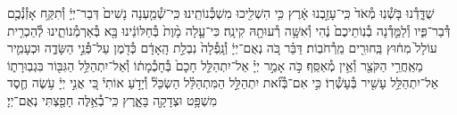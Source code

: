 \documentclass[twoside, openany, parskip=half, 11pt]{book}
\begin{document}
שֻׁדָּ֑דְ֯נוּ בֹּ֤שְׁ֯נֽוּ מְ֯אֹד֙ כִּֽי־עָזַ֣בְנוּ אָ֔רֶץ כִּ֥י הִשְׁלִ֖יכוּ מִשְׁכְּ֯נוֹתֵֽינוּ׃ כִּֽי־שְׁ֯מַ֤עְנָה נָשִׁים֙ דְּבַר־יְיָ֔ וְ֯תִקַּ֥ח אָזְ֯נְ֯כֶ֖ם דְּ֯בַר־פִּ֑יו וְ֯לַמֵּ֤דְ֯נָה בְ֯נֽוֹתֵיכֶם֙ נֶ֔הִי וְ֯אִשָּׁ֥ה רְ֯עוּתָ֖הּ קִינָֽה׃ כִּי־עָ֤לָה מָ֨וֶת֙ בְּ֯חַלּוֹנֵ֔ינוּ בָּ֖א בְּ֯אַרְמְ֯נוֹתֵ֑ינוּ לְ֯הַכְרִ֤ית עוֹלָל֙ מִח֔וּץ בַּֽחוּרִ֖ים מֵֽרְ֯חֹבֽוֹת׃ דַּבֵּ֗ר כֹּ֚ה נְאֻם־יְיָ֔ וְ֯נָֽפְ֯לָה֙ נִבְלַ֣ת הָֽאָדָ֔ם כְּ֯דֹ֖מֶן עַל־פְּ֯נֵ֣י הַשָּׂדֶ֑ה וּכְעָמִ֛יר מֵאַֽחֲרֵ֥י הַקֹּצֵ֖ר וְ֯אֵ֥ין מְ֯אַסֵּֽף׃ כֹּ֣ה אָמַ֣ר יְיָ֗ אַל־יִתְהַלֵּ֤ל חָכָם֙ בְּ֯חָכְ֯מָת֔וֹ וְ֯אַל־יִתְהַלֵּ֥ל הַגִּבּ֖וֹר בִּגְבֽוּרָת֑וֹ אַל־יִתְהַלֵּ֥ל עָשִׁ֖יר בְּ֯עָשְׁ֯רֽוֹ׃ כִּ֣י אִם־בְּ֯זֹ֞את יִתְהַלֵּ֣ל הַמִּתְהַלֵּ֗ל הַשְׂכֵּל֘ וְ֯יָדֹ֣עַ אוֹתִי֒ כִּ֚י אֲנִ֣י יְיָ֔ עֹ֥שֶׂה חֶ֛סֶד מִשְׁפָּ֥ט וּצְדָקָ֖ה בָּאָ֑רֶץ כִּֽי־בְ֯אֵ֥לֶּה חָפַ֖צְתִּי נְאֻם־יְיָ׃
%
%
%
%
\end{document}

